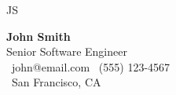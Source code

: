 \documentclass[11pt,a4paper]{article}
\begin{document}
\begin{minipage}[t]{0.3\textwidth}
    \vspace{0pt}
    \begin{center}
        \textcolor{primary}{\Huge JS}
    \end{center}
\end{minipage}
\begin{minipage}[t]{0.7\textwidth}
    \vspace{0pt}
    {\Huge\textbf{\textcolor{primary}{John Smith}}}\\[4pt]
    {\large\textcolor{accent}{Senior Software Engineer}}\\[4pt]
    \textcolor{subtext}{
        \faEnvelope\ john@email.com \quad
        \faPhone\ (555) 123-4567\\
        \faMapMarker\ San Francisco, CA
    }
\end{minipage}

\vspace{1em}
\end{document}
